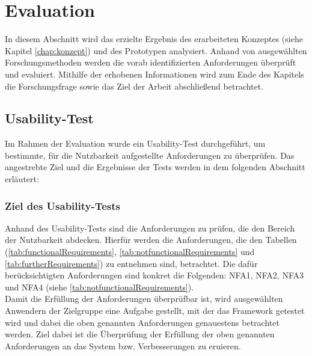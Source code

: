 \chapter{Evaluation}
\label{chap:evaluation}
In diesem Abschnitt wird das erzielte Ergebnis des erarbeiteten Konzeptes (siehe Kapitel \ref{chap:konzept}) und des 
Prototypen analysiert. Anhand von ausgewählten Forschungsmethoden werden die vorab identifizierten Anforderungen überprüft 
und evaluiert. Mithilfe der erhobenen Informationen wird zum Ende des Kapitels die Forschungsfrage sowie das
Ziel der Arbeit abschließend betrachtet. 

\section{Usability-Test}
\label{sec:usabilitytest}
    Im Rahmen der Evaluation wurde ein Usability-Test durchgeführt, um bestimmte, für die Nutzbarkeit aufgestellte Anforderungen zu 
    überprüfen.
    Das angestrebte Ziel und die Ergebnisse der Tests werden in dem folgenden Abschnitt erläutert:
    
    \subsection{Ziel des Usability-Tests}
        Anhand des Usability-Tests sind die Anforderungen zu prüfen, die den Bereich der Nutzbarkeit abdecken. 
        Hierfür werden die Anforderungen, die den Tabellen (\ref{tab:functionalRequirements}, \ref{tab:notfunctionalRequirements} und \ref{tab:furtherRequirements}) 
        zu entnehmen sind, betrachtet. Die dafür berücksichtigten Anforderungen sind konkret die Folgenden: NFA1, NFA2, NFA3 und NFA4 (siehe \ref{tab:notfunctionalRequirements}).
        \\
        Damit die Erfüllung der Anforderungen überprüfbar ist, wird ausgewählten Anwendern der Zielgruppe %
        eine Aufgabe gestellt, mit der das Framework getestet wird und dabei die oben genannten Anforderungen genauestens betrachtet werden. 
        Ziel dabei ist die Überprüfung der Erfüllung der oben genannten Anforderungen an das System bzw. Verbesserungen zu eruieren. 

